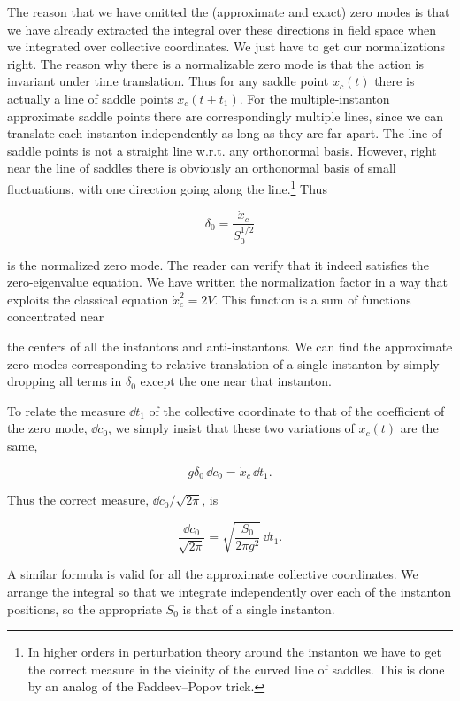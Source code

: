 The reason that we have omitted the (approximate and exact) zero modes is that we
have already extracted the integral over these directions in field space when we
integrated over collective coordinates. We just have to get our normalizations
right. The reason why there is a normalizable zero mode is that the action is
invariant under time translation. Thus for any saddle point $x_c(t)$ there is
actually a line of saddle points $x_c(t+t_1)$. For the multiple-instanton
approximate saddle points there are correspondingly multiple lines, since we can
translate each instanton independently as long as they are far apart. The line
of saddle points is not a straight line w.r.t. any orthonormal basis. However,
right near the line of saddles there is obviously an orthonormal basis of small
fluctuations, with one direction going along the line.\footnote[4]{In higher
orders in perturbation theory around the instanton we have to get the correct
measure in the vicinity of the curved line of saddles. This is done by an analog
of the Faddeev--Popov trick.} Thus

\[
  \delta_0=\frac{\dot x_c}{S_0^{1/2}}
\]

is the normalized zero mode. The reader can verify that it indeed satisfies the
zero-eigenvalue equation. We have written the normalization factor in a way that
exploits the classical equation $\dot x_c^2=2V$. This function is a sum of
functions concentrated near

the centers of all the instantons and anti-instantons. We can find the
approximate zero modes corresponding to relative translation of a single
instanton by simply dropping all terms in $\delta_0$ except the one near that
instanton.

To relate the measure $\dd t_1$ of the collective coordinate to that of the
coefficient of the zero mode, $\dd c_0$, we simply insist that these two
variations of $x_c(t)$ are the same,

\[
  g\delta_0\,\dd c_0=\dot x_c\,\dd t_1.
\]

Thus the correct measure, $\dd c_0/\sqrt{2\pi}$, is

\[
  \frac{\dd c_0}{\sqrt{2\pi}}=
  \sqrt{\frac{S_0}{2\pi g^2}}\,\dd t_1.
\]

A similar formula is valid for all the approximate collective coordinates. We
arrange the integral so that we integrate independently over each of the
instanton positions, so the appropriate $S_0$ is that of a single instanton.

